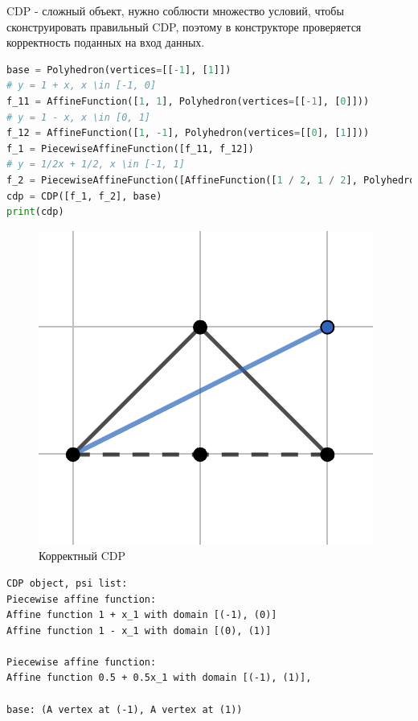 \documentclass[fontsize=14pt]{scrartcl}
\theoremstyle{definition}
\begin{document}
CDP - сложный объект, нужно соблюсти множество условий, чтобы сконструировать правильный CDP, поэтому в конструкторе проверяется корректность поданных на вход данных. 



\begin{lstlisting}[language=Python, label={correct}, style=python] 
base = Polyhedron(vertices=[[-1], [1]])
# y = 1 + x, x \in [-1, 0]
f_11 = AffineFunction([1, 1], Polyhedron(vertices=[[-1], [0]]))
# y = 1 - x, x \in [0, 1]
f_12 = AffineFunction([1, -1], Polyhedron(vertices=[[0], [1]]))
f_1 = PiecewiseAffineFunction([f_11, f_12])
# y = 1/2x + 1/2, x \in [-1, 1]
f_2 = PiecewiseAffineFunction([AffineFunction([1 / 2, 1 / 2], Polyhedron(vertices=[[-1], [1]]))])
cdp = CDP([f_1, f_2], base)
print(cdp)
\end{lstlisting}

\begin{figure}[h]
\centering
  \includegraphics{correct_cdp.png}
  \caption{Корректный CDP}\label{correntcdp}
\end{figure}

\begin{lstlisting}[style=output]
CDP object, psi list:
Piecewise affine function:
Affine function 1 + x_1 with domain [(-1), (0)]
Affine function 1 - x_1 with domain [(0), (1)]

Piecewise affine function:
Affine function 0.5 + 0.5x_1 with domain [(-1), (1)],

base: (A vertex at (-1), A vertex at (1))
\end{lstlisting}
\end{document}
